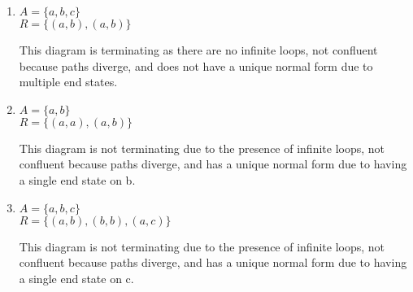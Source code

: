 \documentclass{article}
\begin{document}
\begin{enumerate}
\vspace{6em}

    \item $A = \{ a, b, c \}$ \\
    \hspace*{1em} $R = \{ (a,b), (a,b) \}$
    \begin{center}
    \end{center}
    This diagram is terminating as there are no infinite loops, not confluent because paths diverge, and does not have a unique normal form due to multiple end states.

\vspace{4em}

    \item $A = \{ a, b \}$ \\
    \hspace*{1em} $R = \{ (a,a), (a,b) \}$
    \begin{center}
    \end{center}
    This diagram is not terminating due to the presence of infinite loops, not confluent because paths diverge, and has a unique normal form due to having a single end state on b.

\vspace{4em}

    \item $A = \{ a, b, c \}$ \\
    \hspace*{1em} $R = \{ (a,b), (b,b), (a,c) \}$
    \begin{center}
    \end{center}
    This diagram is not terminating due to the presence of infinite loops, not confluent because paths diverge, and has a unique normal form due to having a single end state on c.


\end{enumerate}
\end{document}

